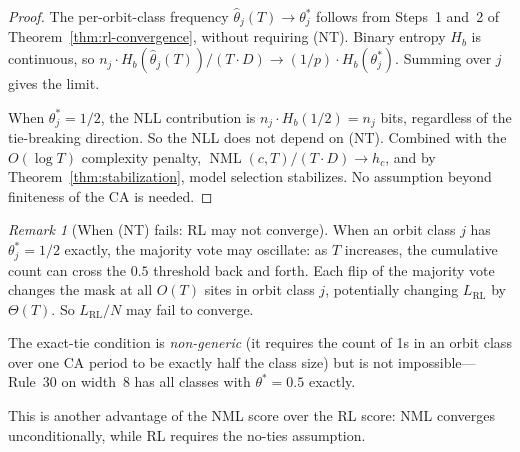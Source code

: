 \documentclass[11pt]{article}
\theoremstyle{definition}
\theoremstyle{remark}
\newtheorem{remark}[theorem]{Remark}
\newcommand{\NML}{\operatorname{NML}}
\newcommand{\RL}{\operatorname{RL}}
\newcommand{\Hb}{H_b}
\begin{document}
\begin{proof}
The per-orbit-class frequency $\hat\theta_j(T) \to \theta_j^*$ follows from Steps~1 and~2 of Theorem~\ref{thm:rl-convergence}, without requiring (NT).
Binary entropy $\Hb$ is continuous, so $n_j \cdot \Hb(\hat\theta_j(T)) / (T \cdot D) \to (1/p) \cdot \Hb(\theta_j^*)$.
Summing over $j$ gives the limit.

When $\theta_j^* = 1/2$, the NLL contribution is $n_j \cdot \Hb(1/2) = n_j$ bits, regardless of the tie-breaking direction.
So the NLL does not depend on (NT).
Combined with the $O(\log T)$ complexity penalty, $\NML(c, T) / (T \cdot D) \to h_c$, and by Theorem~\ref{thm:stabilization}, model selection stabilizes.
No assumption beyond finiteness of the CA is needed.
\end{proof}

\begin{remark}[When \textup{(NT)} fails: RL may not converge]\label{rem:nt-failure}
When an orbit class $j$ has $\theta_j^* = 1/2$ exactly, the majority vote may oscillate: as $T$ increases, the cumulative count can cross the $0.5$ threshold back and forth.
Each flip of the majority vote changes the mask at all $O(T)$ sites in orbit class $j$, potentially changing $L_{\RL}$ by $\Theta(T)$.
So $L_{\RL}/N$ may fail to converge.

The exact-tie condition is \emph{non-generic} (it requires the count of 1s in an orbit class over one CA period to be exactly half the class size) but is not impossible---Rule~30 on width~8 has all classes with $\theta^* = 0.5$ exactly.

This is another advantage of the NML score over the RL score: NML converges unconditionally, while RL requires the no-ties assumption.
\end{remark}
\end{document}
